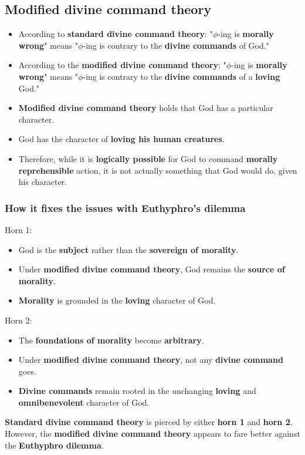 \documentclass[11pt]{article}
\begin{document}
\subsection{Modified divine command theory}
\label{sec:org80dc587}
\begin{itemize}
\item According to \textbf{standard divine command theory}:
"\(\phi\)-ing is \textbf{morally wrong}" means "\(\phi\)-ing is contrary to the \textbf{divine commands} of God."
\item According to the \textbf{modified divine command theory}:
"\(\phi\)-ing is \textbf{morally wrong}" means "\(\phi\)-ing is contrary to the \textbf{divine commands} of a \textbf{loving} God."
\item \textbf{Modified divine command theory} holds that God has a particular character.
\item God has the character of \textbf{loving his human creatures}.
\item Therefore, while it is \textbf{logically possible} for God to command \textbf{morally reprehensible} action, it is not actually something that God would do, given his character.
\end{itemize}
\subsubsection{How it fixes the issues with Euthyphro's dilemma}
\label{sec:orgc036e14}
Horn 1:
\begin{itemize}
\item God is the \textbf{subject} rather than the \textbf{sovereign of morality}.
\item Under \textbf{modified divine command theory}, God remains the \textbf{source of morality}.
\item \textbf{Morality} is grounded in the \textbf{loving} character of God.
\end{itemize}

Horn 2:
\begin{itemize}
\item The \textbf{foundations of morality} become \textbf{arbitrary}.
\item Under \textbf{modified divine command theory}, not any \textbf{divine command} goes.
\item \textbf{Divine commands} remain rooted in the unchanging \textbf{loving} and \textbf{omnibenevolent} character of God.
\end{itemize}

\textbf{Standard divine command theory} is pierced by either \textbf{horn 1} and \textbf{horn 2}. However, the \textbf{modified divine command theory} appears to fare better against the \textbf{Euthyphro dilemma}.
\end{document}
